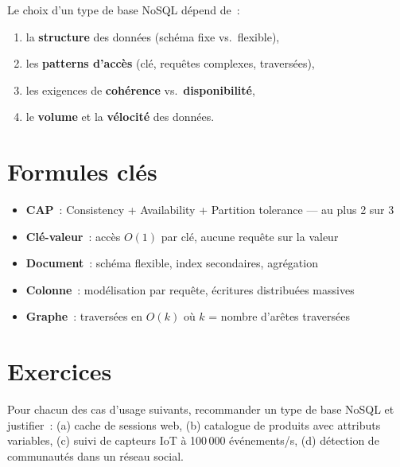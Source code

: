 \begin{proposition}
Le choix d'un type de base NoSQL d\'epend de~:
\begin{enumerate}
  \item la \textbf{structure} des donn\'ees (sch\'ema fixe vs.\ flexible),
  \item les \textbf{patterns d'acc\`es} (cl\'e, requ\^etes complexes, travers\'ees),
  \item les exigences de \textbf{coh\'erence} vs.\ \textbf{disponibilit\'e},
  \item le \textbf{volume} et la \textbf{v\'elocit\'e} des donn\'ees.
\end{enumerate}
\end{proposition}

\section{Formules cl\'es}

\begin{formules}
\begin{itemize}
  \item \textbf{CAP}~: Consistency + Availability + Partition tolerance --- au plus 2 sur 3
  \item \textbf{Cl\'e-valeur}~: acc\`es $O(1)$ par cl\'e, aucune requ\^ete sur la valeur
  \item \textbf{Document}~: sch\'ema flexible, index secondaires, agr\'egation
  \item \textbf{Colonne}~: mod\'elisation par requ\^ete, \'ecritures distribu\'ees massives
  \item \textbf{Graphe}~: travers\'ees en $O(k)$ o\`u $k$ = nombre d'ar\^etes travers\'ees
\end{itemize}
\end{formules}

\section{Exercices}

\begin{exercice}
Pour chacun des cas d'usage suivants, recommander un type de base NoSQL
et justifier~: (a) cache de sessions web, (b) catalogue de produits avec
attributs variables, (c) suivi de capteurs IoT \`a 100\,000 \'ev\'enements/s,
(d) d\'etection de communaut\'es dans un r\'eseau social.
\end{exercice}

